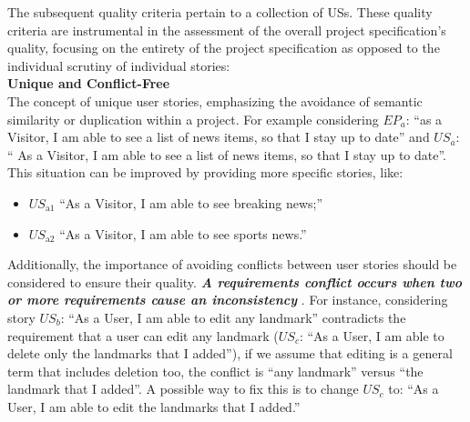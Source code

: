 The subsequent quality criteria pertain to a collection of USs. These quality criteria are instrumental in the assessment of the overall project specification's quality, focusing on the entirety of the project specification as opposed to the individual scrutiny of individual stories: \\ 
\textbf{Unique and Conﬂict-Free}\\ 
The concept of unique user stories, emphasizing the avoidance of semantic similarity or duplication within a project. For example considering $EP_a$: \enquote{as a Visitor, I am able to see a list of news items, so that I stay up to date} and $US_a$: \enquote{ As a Visitor, I am able to see a list of news items, so that I stay up to date}. This situation can be improved by providing more specific stories, like:
\begin{itemize}
\item $US_{\text{a1}}$ \enquote{As a Visitor, I am able to see breaking news;}
\item $US_{\text{a2}}$ \enquote{As a Visitor, I am able to see sports news.}
\end{itemize}
Additionally, the importance of avoiding conflicts between user stories should be considered to ensure their quality. \textbf{\emph{A requirements conflict occurs when two or more requirements cause an inconsistency}} \cite{paja2013managing} \cite{robinson1989integrating}. For instance, considering story $US_b$: \enquote{As a User, I am able to edit any landmark} contradicts the requirement that a user can edit any landmark ($US_c$: \enquote{As a User, I am able to delete only the landmarks that I added}), if we assume that editing is a general term that includes deletion too, the conflict is  \enquote{any landmark} versus \enquote{the landmark that I added}. A possible way to fix this is to change $US_c$ to: \enquote{As a User, I am able to edit the landmarks that I added.} \cite{lucassen2016improving}

